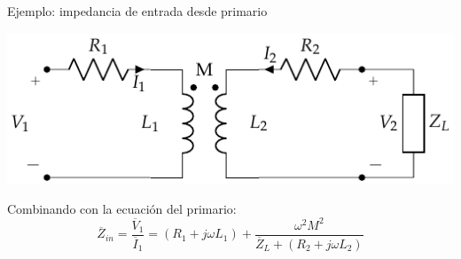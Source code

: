 \documentclass[xcolor={usenames,svgnames,dvipsnames}]{beamer}
\begin{document}
\begin{frame}[label={sec:orgcb657e2}]{Ejemplo: impedancia de entrada desde primario}
\begin{center}
\includegraphics[height=0.45\textheight]{../figs/Trafo_Real_ImpSec.pdf}
\end{center}
Combinando con la ecuación del primario:
\[
  \overline{Z}_{in}  = \frac{\overline{V}_1}{\overline{I}_1} =  (R_1 + j \omega L_1) + \frac{\omega^2 M^2}{\overline{Z}_L + (R_2 + j \omega L_2)}
\]
\end{frame}
\end{document}
